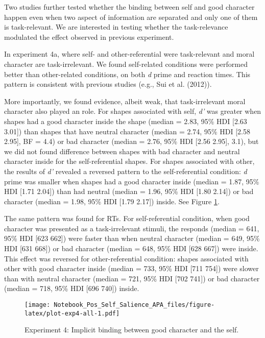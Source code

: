 \documentclass[
  man]{apa6}
\begin{document}
Two studies further tested whether the binding between self and good character happen even when two aspect of information are separated and only one of them is task-relevant. We are interested in testing whether the task-relevance modulated the effect observed in previous experiment.

In experiment 4a, where self- and other-referential were task-relevant and moral character are task-irrelevant. We found self-related conditions were performed better than other-related conditions, on both \emph{d} prime and reaction times. This pattern is consistent with previous studies (e.g., Sui et al. (2012)).

More importantly, we found evidence, albeit weak, that task-irrelevant moral character also played an role. For shapes associated with self, \emph{d'} was greater when shapes had a good character inside the shape (median = 2.83, 95\% HDI {[}2.63 3.01{]}) than shapes that have neutral character (median = 2.74, 95\% HDI {[}2.58 2.95{]}, BF = 4.4) or bad character (median = 2.76, 95\% HDI {[}2.56 2.95{]}, 3.1), but we did not found difference between shapes with bad character and neutral character inside for the self-referential shapes. For shapes associated with other, the results of \emph{d'} revealed a reversed pattern to the self-referential condition: \emph{d} prime was smaller when shapes had a good character inside (median = 1.87, 95\% HDI {[}1.71 2.04{]}) than had neutral (median = 1.96, 95\% HDI {[}1.80 2.14{]}) or bad character (median = 1.98, 95\% HDI {[}1.79 2.17{]}) inside. See Figure \ref{fig:plot-exp4-all}.

The same pattern was found for RTs. For self-referential condition, when good character was presented as a task-irrelevant stimuli, the responds (median = 641, 95\% HDI {[}623 662{]}) were faster than when neutral character (median = 649, 95\% HDI {[}631 668{]}) or bad character (median = 648, 95\% HDI {[}628 667{]}) were inside. This effect was reversed for other-referential condition: shapes associated with other with good character inside (median = 733, 95\% HDI {[}711 754{]}) were slower than with neutral character (median = 721, 95\% HDI {[}702 741{]}) or bad character (median = 718, 95\% HDI {[}696 740{]}) inside.

\begin{figure}
\centering
\texttt{[image: Notebook\_Pos\_Self\_Salience\_APA\_files/figure-latex/plot-exp4-all-1.pdf]}
\caption{\label{fig:plot-exp4-all}Experiment 4: Implicit binding between good character and the self.}
\end{figure}
\end{document}
